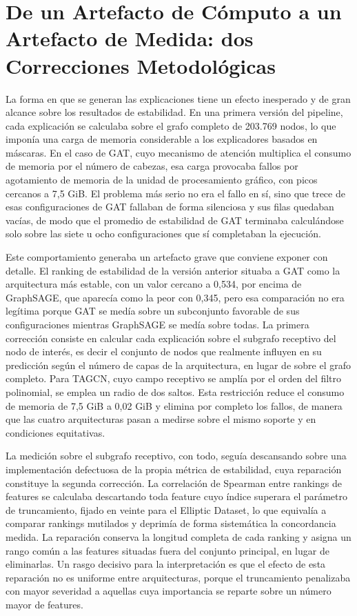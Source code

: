 \section{De un Artefacto de Cómputo a un Artefacto de Medida: dos Correcciones Metodológicas}

La forma en que se generan las explicaciones tiene un efecto inesperado y de gran alcance sobre los resultados de estabilidad. En una primera versión del pipeline, cada explicación se calculaba sobre el grafo completo de 203.769 nodos, lo que imponía una carga de memoria considerable a los explicadores basados en máscaras. En el caso de GAT, cuyo mecanismo de atención multiplica el consumo de memoria por el número de cabezas, esa carga provocaba fallos por agotamiento de memoria de la unidad de procesamiento gráfico, con picos cercanos a 7,5 GiB. El problema más serio no era el fallo en sí, sino que trece de esas configuraciones de GAT fallaban de forma silenciosa y sus filas quedaban vacías, de modo que el promedio de estabilidad de GAT terminaba calculándose solo sobre las siete u ocho configuraciones que sí completaban la ejecución.

Este comportamiento generaba un artefacto grave que conviene exponer con detalle. El ranking de estabilidad de la versión anterior situaba a GAT como la arquitectura más estable, con un valor cercano a 0,534, por encima de GraphSAGE, que aparecía como la peor con 0,345, pero esa comparación no era legítima porque GAT se medía sobre un subconjunto favorable de sus configuraciones mientras GraphSAGE se medía sobre todas. La primera corrección consiste en calcular cada explicación sobre el subgrafo receptivo del nodo de interés, es decir el conjunto de nodos que realmente influyen en su predicción según el número de capas de la arquitectura, en lugar de sobre el grafo completo. Para TAGCN, cuyo campo receptivo se amplía por el orden del filtro polinomial, se emplea un radio de dos saltos. Esta restricción reduce el consumo de memoria de 7,5 GiB a 0,02 GiB y elimina por completo los fallos, de manera que las cuatro arquitecturas pasan a medirse sobre el mismo soporte y en condiciones equitativas.

La medición sobre el subgrafo receptivo, con todo, seguía descansando sobre una implementación defectuosa de la propia métrica de estabilidad, cuya reparación constituye la segunda corrección. La correlación de Spearman entre rankings de features se calculaba descartando toda feature cuyo índice superara el parámetro de truncamiento, fijado en veinte para el Elliptic Dataset, lo que equivalía a comparar rankings mutilados y deprimía de forma sistemática la concordancia medida. La reparación conserva la longitud completa de cada ranking y asigna un rango común a las features situadas fuera del conjunto principal, en lugar de eliminarlas. Un rasgo decisivo para la interpretación es que el efecto de esta reparación no es uniforme entre arquitecturas, porque el truncamiento penalizaba con mayor severidad a aquellas cuya importancia se reparte sobre un número mayor de features.

